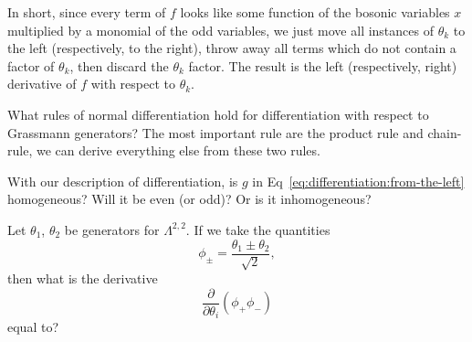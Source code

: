 In short, since every term of $f$ looks like some function of the
bosonic variables $x$ multiplied by a monomial of the odd variables, we
just move all instances of $\theta_{k}$ to the left (respectively, to the right), throw
away all terms which do not contain a factor of $\theta_{k}$, then
discard the $\theta_{k}$ factor. The result is the left (respectively,
right) derivative of $f$ with respect to $\theta_{k}$.

\begin{puzzle}
What rules of normal differentiation hold for differentiation with
respect to Grassmann generators? The most important rule are the product
rule and chain-rule, we can derive everything else from these two rules.
\end{puzzle}

\begin{exercise}
With our description of differentiation, is $g$ in
Eq~\eqref{eq:differentiation:from-the-left} homogeneous? Will it be even
(or odd)? Or is it inhomogeneous?
\end{exercise}

\begin{exercise}
Let $\theta_{1}$, $\theta_{2}$ be generators for $\Lambda^{2,2}$.
If we take the quantities
\begin{equation}
\phi_{\pm} = \frac{\theta_{1}\pm\theta_{2}}{\sqrt{2}},
\end{equation}
then what is the derivative
\begin{equation*}
\frac{\partial}{\partial\theta_{i}}(\phi_{+}\phi_{-})
\end{equation*}
equal to?
\end{exercise}

